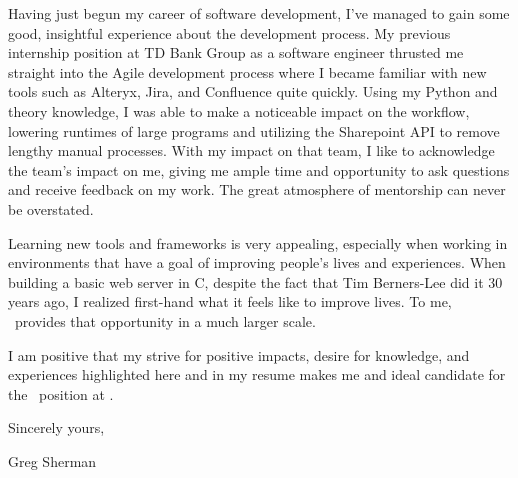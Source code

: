 \documentclass{article}
\begin{document}
Having just begun my career of software development, I've managed to gain some good, insightful experience about the development process. My previous internship position at TD Bank Group as a software engineer thrusted me straight into the Agile development process where I became familiar with new tools such as Alteryx, Jira, and Confluence quite quickly. Using my Python and theory knowledge, I was able to make a noticeable impact on the workflow, lowering runtimes of large programs and utilizing the Sharepoint API to remove lengthy manual processes. With my impact on that team, I like to acknowledge the team's impact on me, giving me ample time and opportunity to ask questions and receive feedback on my work. The great atmosphere of mentorship can never be overstated.

Learning new tools and frameworks is very appealing, especially when working in environments that have a goal of improving people's lives and experiences. When building a basic web server in C, despite the fact that Tim Berners-Lee did it 30 years ago, I realized first-hand what it feels like to improve lives. To me, \compname\ provides that opportunity in a much larger scale. \complive 

I am positive that my strive for positive impacts, desire for knowledge, and experiences highlighted here and in my resume makes me and ideal candidate for the \posname\ position at \compname.

\bigskip %

Sincerely yours,

\vspace{50pt} %

Greg Sherman
\end{document}
